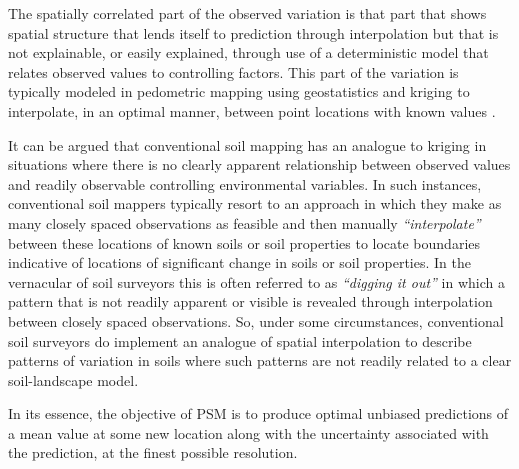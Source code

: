\documentclass[graybox,natbib,nospthms,UStrade]{svmono}
\let\BeginKnitrBlock\begin \let\EndKnitrBlock\end
\let\BeginKnitrBlock\begin \let\EndKnitrBlock\end
\begin{document}
The spatially correlated part of the observed variation is that part
that shows spatial structure that lends itself to prediction through
interpolation but that is not explainable, or easily explained, through
use of a deterministic model that relates observed values to controlling
factors. This part of the variation is typically modeled in pedometric
mapping using geostatistics and kriging to interpolate, in an optimal
manner, between point locations with known values
\citep{goovaerts2001geostatistical, McBratney2003Geoderma}.

It can be argued that conventional soil mapping has an analogue to
kriging in situations where there is no clearly apparent relationship
between observed values and readily observable controlling environmental
variables. In such instances, conventional soil mappers typically resort
to an approach in which they make as many closely spaced observations as
feasible and then manually \emph{``interpolate''} between these locations of
known soils or soil properties to locate boundaries indicative of
locations of significant change in soils or soil properties. In the
vernacular of soil surveyors this is often referred to as \emph{``digging it
out''} in which a pattern that is not readily apparent or visible is
revealed through interpolation between closely spaced observations. So,
under some circumstances, conventional soil surveyors do implement an
analogue of spatial interpolation to describe patterns of variation in
soils where such patterns are not readily related to a clear
soil-landscape model.

\BeginKnitrBlock{rmdnote}
In its essence, the objective
of PSM is to produce optimal unbiased predictions of a mean value at some new location along with the uncertainty associated with the prediction, at the finest possible resolution.
\EndKnitrBlock{rmdnote}
\end{document}
